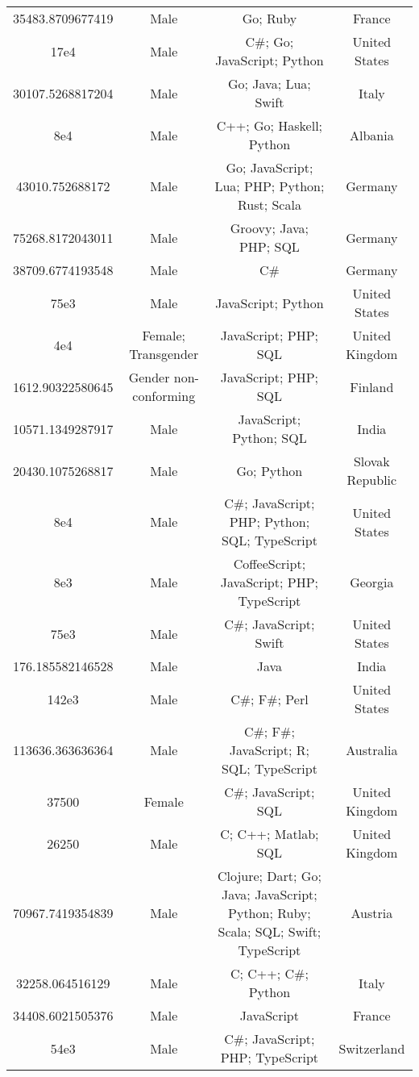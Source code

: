 \begin{center}
\begin{tabular}{ |c|c|c|c| }
35483.8709677419  &  Male  &  Go; Ruby  &  France  \\ 
17e4  &  Male  &  C\#; Go; JavaScript; Python  &  United States  \\ 
30107.5268817204  &  Male  &  Go; Java; Lua; Swift  &  Italy  \\ 
8e4  &  Male  &  C++; Go; Haskell; Python  &  Albania  \\ 
43010.752688172  &  Male  &  Go; JavaScript; Lua; PHP; Python; Rust; Scala  &  Germany  \\ 
75268.8172043011  &  Male  &  Groovy; Java; PHP; SQL  &  Germany  \\ 
38709.6774193548  &  Male  &  C\#  &  Germany  \\ 
75e3  &  Male  &  JavaScript; Python  &  United States  \\ 
4e4  &  Female; Transgender  &  JavaScript; PHP; SQL  &  United Kingdom  \\ 
1612.90322580645  &  Gender non-conforming  &  JavaScript; PHP; SQL  &  Finland  \\ 
10571.1349287917  &  Male  &  JavaScript; Python; SQL  &  India  \\ 
20430.1075268817  &  Male  &  Go; Python  &  Slovak Republic  \\ 
8e4  &  Male  &  C\#; JavaScript; PHP; Python; SQL; TypeScript  &  United States  \\ 
8e3  &  Male  &  CoffeeScript; JavaScript; PHP; TypeScript  &  Georgia  \\ 
75e3  &  Male  &  C\#; JavaScript; Swift  &  United States  \\ 
176.185582146528  &  Male  &  Java  &  India  \\ 
142e3  &  Male  &  C\#; F\#; Perl  &  United States  \\ 
113636.363636364  &  Male  &  C\#; F\#; JavaScript; R; SQL; TypeScript  &  Australia  \\ 
37500  &  Female  &  C\#; JavaScript; SQL  &  United Kingdom  \\ 
26250  &  Male  &  C; C++; Matlab; SQL  &  United Kingdom  \\ 
70967.7419354839  &  Male  &  Clojure; Dart; Go; Java; JavaScript; Python; Ruby; Scala; SQL; Swift; TypeScript  &  Austria  \\ 
32258.064516129  &  Male  &  C; C++; C\#; Python  &  Italy  \\ 
34408.6021505376  &  Male  &  JavaScript  &  France  \\ 
54e3  &  Male  &  C\#; JavaScript; PHP; TypeScript  &  Switzerland  \\ 

\end{tabular}
\end{center}
